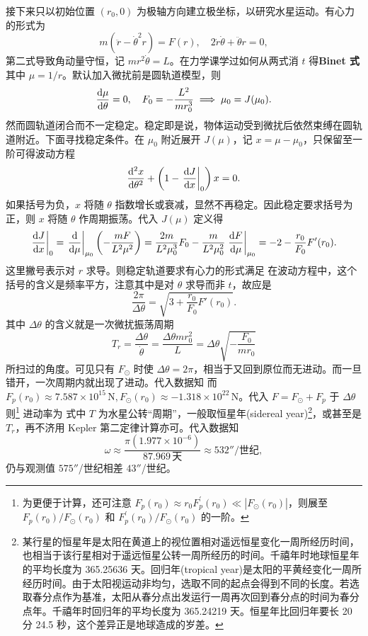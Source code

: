 接下来只以初始位置 $(r_0,0)$ 为极轴方向建立极坐标，以研究水星运动。有心力的形式为
\[
m(\ddot r-\dot\theta^2r)=F(r),\quad 2\dot r\dot\theta+\ddot\theta r=0,
\]
第二式导致角动量守恒，记 $mr^2{\dot \theta}=L$。在力学课学过如何从两式消 $t$ 得\textbf{Binet 式}
其中 $\mu=1/r$。默认加入微扰前是圆轨道模型，则
\[
\dv{\mu}{\theta}=0,\quad F_0=-\frac{L^2}{mr_0^3}\implies \mu_0=J(\mu_0).
\]
然而圆轨道闭合而不一定稳定。稳定即是说，物体运动受到微扰后依然束缚在圆轨道附近。下面寻找稳定条件。在 $\mu_0$ 附近展开 $J(\mu)$，记 $x=\mu-\mu_0$，只保留至一阶可得波动方程
\[
\dv[2]{x}{\theta}+\left(1-\eval{\dv{J}{x}}_{0}\right)x=0.
\]
如果括号为负，$x$ 将随 $\theta$ 指数增长或衰减，显然不再稳定。因此稳定要求括号为正，则 $x$ 将随 $\theta$ 作周期振荡。代入 $J(\mu)$ 定义得
\[\eval{\dv{J}{x}}_{0}=\eval{\dv{\mu}}_{\mu_0}\left(- \frac{mF}{L^2\mu^2} \right)= \frac{2m}{L^2\mu_0^3}F_0 - \frac{m}{L^2\mu_0^2} \eval{\dv{F}{\mu}}_{\mu_0} = -2 - \frac{r_0}{F_0} F'(r_0).\]
这里撇号表示对 $r$ 求导。则稳定轨道要求有心力的形式满足
在波动方程中，这个括号的含义是频率平方，注意其中是对 $\theta$ 求导而非 $t$，故应是
\[
\frac{2\pi}{\Delta\theta}=\sqrt{3+\frac{r_0}{F_0} F'(r_0)}.
\]
其中 $\Delta\theta$ 的含义就是一次微扰振荡周期
\[
T_r=\frac{\Delta\theta}{\dot\theta}=\frac{\Delta\theta mr_0^2}{L}=\Delta\theta\sqrt{-\frac{F_0}{mr_0}}
\]
所扫过的角度。可见只有 $F_\odot$ 时使 $\Delta\theta=2\pi$，相当于又回到原位而无进动。而一旦错开，一次周期内就出现了进动。代入数据知
而 $F_p(r_0)\approx 7.587 \times 10^{15}\,\mathrm{N}, F_\odot(r_0)\approx -1.318 \times 10^{22}\,\mathrm{N}$。代入 $F=F_{\odot}+F_p$ 于 $\Delta\theta$ 则\footnote{为更便于计算，还可注意 $F_p(r_0)\approx r_0 F_p^{\prime}(r_0) \ll |F_\odot(r_0)|$，则展至 $F_p(r_0) / F_\odot(r_0)$ 和 $F_p^{\prime}(r_0) / F_\odot(r_0)$ 的一阶。}
进动率为
式中 $T$ 为水星公转“周期”，一般取恒星年(sidereal year)\footnote{某行星的恒星年是太阳在黄道上的视位置相对遥远恒星变化一周所经历时间，也相当于该行星相对于遥远恒星公转一周所经历的时间。千禧年时地球恒星年的平均长度为 365.25636 天。回归年(tropical year)是太阳的平黄经变化一周所经历时间。由于太阳视运动非均匀，选取不同的起点会得到不同的长度。若选取春分点作为基准，太阳从春分点出发运行一周再次回到春分点的时间为春分点年。千禧年时回归年的平均长度为 365.24219 天。恒星年比回归年要长 20 分 24.5 秒，这个差异正是地球造成的岁差。}，或甚至是 $T_r$，再不济用 Kepler 第二定律计算亦可。代入数据知
\[\omega\approx\frac{\pi(1.977\times 10^{-6})}{87.969\,\text{天}}\approx 532''/\text{世纪},\]
仍与观测值 $575''$/世纪相差 $43''$/世纪。

